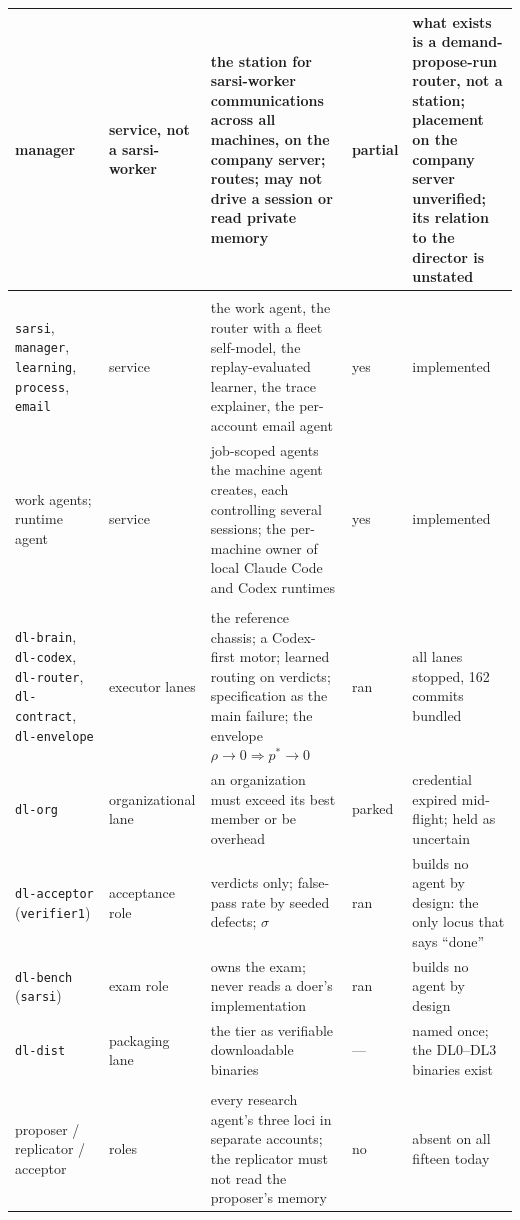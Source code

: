 \begin{table}[!htbp]
\begin{tabularx}{\textwidth}{@{}>{\raggedright\arraybackslash}p{3.6cm}>{\raggedright\arraybackslash}p{1.7cm}Y>{\raggedright\arraybackslash}p{1.2cm}>{\raggedright\arraybackslash}p{2.9cm}@{}}
manager & service, not a sarsi-worker & the station for sarsi-worker communications across all machines, on the company server; routes; may not drive a session or read private memory & partial & what exists is a demand-propose-run router, not a station; placement on the company server unverified; its relation to the director is unstated \\
\midrule
{} \\
\texttt{sarsi}, \texttt{manager}, \texttt{learning}, \texttt{process}, \texttt{email} & service & the work agent, the router with a fleet self-model, the replay-evaluated learner, the trace explainer, the per-account email agent & yes & implemented \\
work agents; runtime agent & service & job-scoped agents the machine agent creates, each controlling several sessions; the per-machine owner of local Claude Code and Codex runtimes & yes & implemented \\
\midrule
{} \\
\texttt{dl-brain}, \texttt{dl-codex}, \texttt{dl-router}, \texttt{dl-contract}, \texttt{dl-envelope} & executor lanes & the reference chassis; a Codex-first motor; learned routing on verdicts; specification as the main failure; the envelope $\rho \to 0 \Rightarrow p^{*} \to 0$ & ran & all lanes stopped, 162 commits bundled \\
\texttt{dl-org} & organizational lane & an organization must exceed its best member or be overhead & parked & credential expired mid-flight; held as uncertain \\
\texttt{dl-acceptor} (\texttt{verifier1}) & acceptance role & verdicts only; false-pass rate by seeded defects; $\sigma$ & ran & builds no agent by design: the only locus that says ``done'' \\
\texttt{dl-bench} (\texttt{sarsi}) & exam role & owns the exam; never reads a doer's implementation & ran & builds no agent by design \\
\texttt{dl-dist} & packaging lane & the tier as verifiable downloadable binaries & --- & named once; the DL0--DL3 binaries exist \\
\midrule
{} \\
proposer / replicator / acceptor & roles & every research agent's three loci in separate accounts; the replicator must not read the proposer's memory & no & absent on all fifteen today \\

\end{tabularx}
\end{table}
